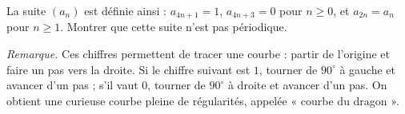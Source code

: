 La suite $(a_n)$ est définie ainsi : $a_{4n+1} = 1$, $a_{4n+3} = 0$ pour $n \geq 0$, et $a_{2n} = a_n$ pour $n \geq 1$. Montrer que cette suite n'est pas périodique.

\emph{Remarque.} Ces chiffres permettent de tracer une courbe : partir de l'origine et faire un pas vers la droite. Si le chiffre suivant est $1$, tourner de $90^\circ$ à gauche et avancer d'un pas ; s'il vaut $0$, tourner de $90^\circ$ à droite et avancer d'un pas. On obtient une curieuse courbe pleine de régularités, appelée « courbe du dragon ».
